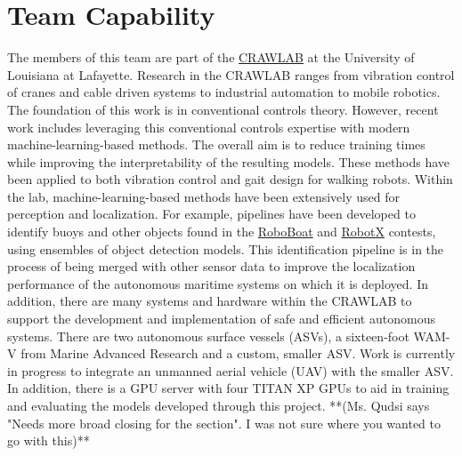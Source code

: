 \documentclass[letterpaper, 12 pt, conference]{ieeeconf}
\begin{document}
\section{Team Capability} 
The members of this team are part of the \hyperlink{https://userweb.ucs.louisiana.edu/~jev9637/}{CRAWLAB} at the University of Louisiana at Lafayette. Research in the CRAWLAB ranges from vibration control of cranes and cable driven systems to industrial automation to mobile robotics. The foundation of this work is in conventional controls theory. However, recent work includes leveraging this conventional controls expertise with modern machine-learning-based methods. The overall aim is to reduce training times while improving the interpretability of the resulting models. These methods have been applied to both vibration control and gait design for walking robots.
Within the lab, machine-learning-based methods have been extensively used for perception and localization. For example, pipelines have been developed to identify buoys and other objects found in the \hyperlink{https://roboboat.org}{RoboBoat} and \hyperlink{https://robotx.org}{RobotX} contests, using ensembles of object detection models. This identification pipeline is in the process of being merged with other sensor data to improve the localization performance of the autonomous maritime systems on which it is deployed. 
In addition, there are many systems and hardware within the CRAWLAB to support the development and implementation of safe and efficient autonomous systems. There are two autonomous surface vessels (ASVs), a sixteen-foot WAM-V from Marine Advanced Research and a custom, smaller ASV. Work is currently in progress to integrate an unmanned aerial vehicle (UAV) with the smaller ASV. In addition, there is a GPU server with four TITAN XP GPUs to aid in training and evaluating the models developed through this project. **(Ms. Qudsi says "Needs more broad closing for the section". I was not sure where you wanted to go with this)**
\end{document}
